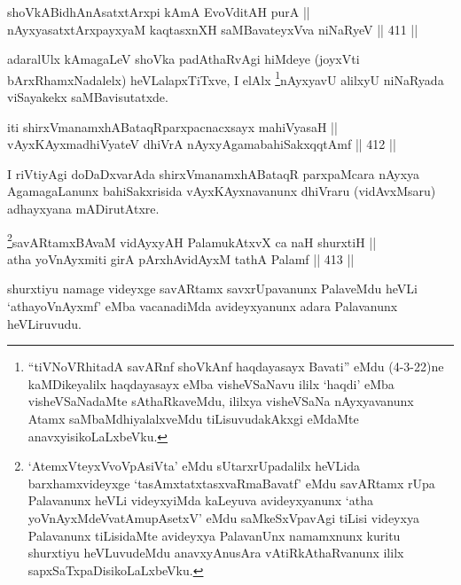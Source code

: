 \begin{shl}
shoVkABidhAnAsatxtArxpi kAmA EvoVditAH purA || \\
nAyxyasatxtArxpayxyaM kaqtasxnXH saMBavateyxVva niNaRyeV \hfill || 411 ||  
\end{shl}

\begin{artha}
adaralUlx kAmagaLeV shoVka padAthaRvAgi hiMdeye (joyxVti
bArxRhamxNadalelx) heVLalapxTiTxve, I elAlx \footnote{``tiVNoVRhitadA savARnf shoVkAnf haqdayasayx Bavati'' eMdu
(4-3-22)ne kaMDikeyalilx haqdayasayx eMba visheVSaNavu ililx `haqdi'
eMba visheVSaNadaMte sAthaRkaveMdu, ililxya visheVSaNa nAyxyavanunx
Atamx saMbaMdhiyalalxveMdu tiLisuvudakAkxgi eMdaMte
anavxyisikoLaLxbeVku.}nAyxyavU alilxyU niNaRyada viSayakekx saMBavisutatxde.
\end{artha}

\begin{shl}
iti shirxVmanamxhABataqRparxpacnacxsayx mahiVyasaH || \\
vAyxKAyxmadhiVyateV dhiVrA nAyxyAgamabahiSakxqqtAmf \hfill || 412 ||  
\end{shl}	

\begin{artha}
I riVtiyAgi doDaDxvarAda shirxVmanamxhABataqR parxpaMcara nAyxya
AgamagaLanunx bahiSakxrisida vAyxKAyxnavanunx dhiVraru (vidAvxMsaru)
adhayxyana mADirutAtxre.
\end{artha}




\begin{shl}
\footnote{`AtemxVteyxVvoVpAsiVta' eMdu sUtarxrUpadalilx heVLida barxhamxvideyxge `tasAmxtatxtasxvaRmaBavatf' eMdu savARtamx rUpa Palavanunx heVLi videyxyiMda kaLeyuva avideyxyanunx `atha yoV\s nAyxMdeVvatAmupAsetxV' eMdu saMkeSxVpavAgi tiLisi videyxya Palavanunx tiLisidaMte avideyxya PalavanUnx namamxnunx kuritu shurxtiyu heVLuvudeMdu anavxyAnusAra vAtiRkAthaRvanunx ililx sapxSaTxpaDisikoLaLxbeVku.}savARtamxBAvaM vidAyxyAH PalamukAtxvX ca naH shurxtiH || \\
atha yoV\s nAyxmiti girA pArxhAvidAyxM tathA Palamf \hfill || 413 ||  
\end{shl}

\begin{artha}
shurxtiyu namage videyxge savARtamx savxrUpavanunx PalaveMdu
heVLi `athayoV\s nAyxmf' eMba vacanadiMda avideyxyanunx adara Palavanunx
heVLiruvudu.
\end{artha}

